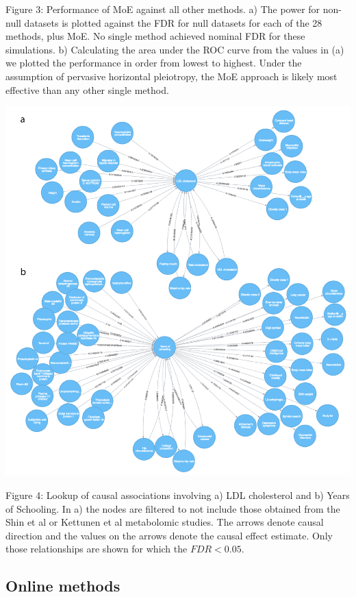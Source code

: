 \documentclass[]{article}
\begin{document}
Figure 3: Performance of MoE against all other methods. a) The power for
non-null datasets is plotted against the FDR for null datasets for each
of the 28 methods, plus MoE. No single method achieved nominal FDR for
these simulations. b) Calculating the area under the ROC curve from the
values in (a) we plotted the performance in order from lowest to
highest. Under the assumption of pervasive horizontal pleiotropy, the
MoE approach is likely most effective than any other single method.

\newpage

\includegraphics{images/fig4-01.png}

Figure 4: Lookup of causal associations involving a) LDL cholesterol and
b) Years of Schooling. In a) the nodes are filtered to not include those
obtained from the Shin et al or Kettunen et al metabolomic studies. The
arrows denote causal direction and the values on the arrows denote the
causal effect estimate. Only those relationships are shown for which the
\(FDR < 0.05\).

\newpage

\subsection{Online methods}\label{online-methods}
\end{document}
